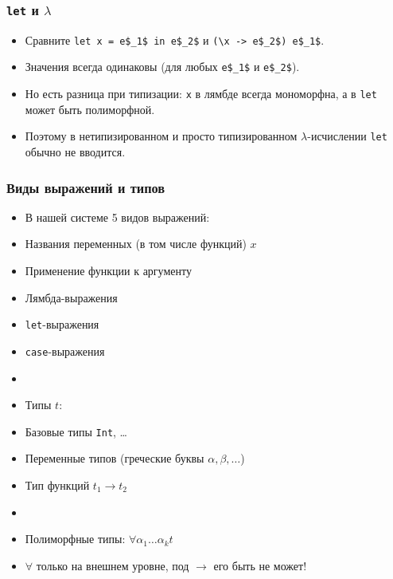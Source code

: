 \documentclass[11pt]{beamer}
\begin{document}
\begin{frame}[fragile]
  \frametitle{\lstinline|let| и $\lambda$}
  \begin{itemize}
    \item Сравните \lstinline[mathescape]|let x = e$_1$ in e$_2$| и \lstinline[mathescape]|(\x -> e$_2$) e$_1$|.
          \pause
    \item Значения всегда одинаковы (для любых \lstinline[mathescape]|e$_1$| и \lstinline[mathescape]|e$_2$|).
          \pause
    \item Но есть разница при типизации: \pause \lstinline|x| в лямбде всегда мономорфна, а в \lstinline|let| может быть полиморфной.
          \pause
    \item Поэтому в нетипизированном и просто типизированном $\lambda$-исчислении \lstinline|let| обычно не вводится.
  \end{itemize}
\end{frame}

\begin{frame}[fragile]
  \frametitle{Виды выражений и типов}
  \begin{itemize}
    \item В нашей системе 5 видов выражений:
          \pause
    \item Названия переменных (в том числе функций) $x$
    \item Применение функции к аргументу
    \item Лямбда-выражения
    \item \lstinline|let|-выражения
    \item \lstinline|case|-выражения
    \item[]
      \pause
    \item Типы $t$:
          \pause
    \item Базовые типы \lstinline|Int|, \ldots
    \item Переменные типов (греческие буквы $\alpha, \beta, \ldots$)
    \item Тип функций $t_1 \to t_2$
    \item[]
      \pause
    \item Полиморфные типы: $\forall \alpha_1 \ldots \alpha_k t$
          \pause
    \item $\forall$ только на внешнем уровне, под $\to$ его быть не может!
  \end{itemize}
\end{frame}
\end{document}
